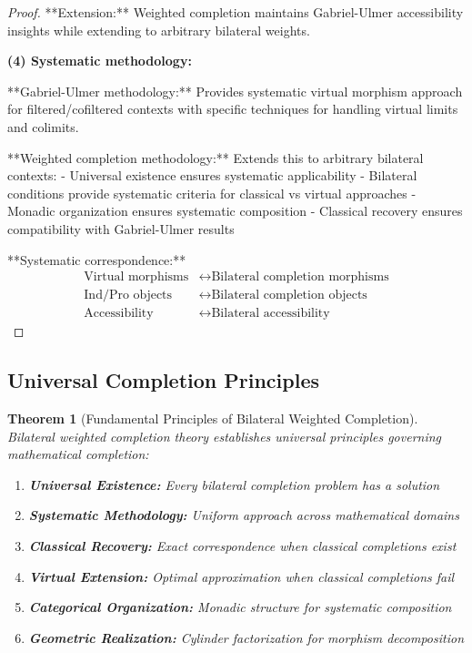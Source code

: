 \documentclass[11pt]{article}
\theoremstyle{plain}
\newtheorem{theorem}{Theorem}[section]
\theoremstyle{definition}
\theoremstyle{remark}
\begin{document}
\begin{proof}
**Extension:** Weighted completion maintains Gabriel-Ulmer accessibility insights while extending to arbitrary bilateral weights.

\textbf{(4) Systematic methodology:}

**Gabriel-Ulmer methodology:** Provides systematic virtual morphism approach for filtered/cofiltered contexts with specific techniques for handling virtual limits and colimits.

**Weighted completion methodology:** Extends this to arbitrary bilateral contexts:
- Universal existence ensures systematic applicability
- Bilateral conditions provide systematic criteria for classical vs virtual approaches  
- Monadic organization ensures systematic composition
- Classical recovery ensures compatibility with Gabriel-Ulmer results

**Systematic correspondence:**
\begin{align}
\text{Virtual morphisms} &\leftrightarrow \text{Bilateral completion morphisms} \\
\text{Ind/Pro objects} &\leftrightarrow \text{Bilateral completion objects} \\
\text{Accessibility} &\leftrightarrow \text{Bilateral accessibility}
\end{align}
\end{proof}

\subsection{Universal Completion Principles}

\begin{theorem}[Fundamental Principles of Bilateral Weighted Completion]\label{thm:universal-principles}
Bilateral weighted completion theory establishes universal principles governing mathematical completion:

\begin{enumerate}
\item \textbf{Universal Existence:} Every bilateral completion problem has a solution
\item \textbf{Systematic Methodology:} Uniform approach across mathematical domains  
\item \textbf{Classical Recovery:} Exact correspondence when classical completions exist
\item \textbf{Virtual Extension:} Optimal approximation when classical completions fail
\item \textbf{Categorical Organization:} Monadic structure for systematic composition
\item \textbf{Geometric Realization:} Cylinder factorization for morphism decomposition
\end{enumerate}
\end{theorem}
\end{document}
